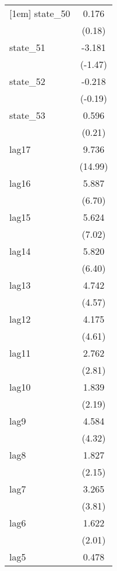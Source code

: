 {\begin{tabular}{l*{1}{c}}
[1em]
state\_50    &       0.176         \\
            &      (0.18)         \\
[1em]
state\_51    &      -3.181         \\
            &     (-1.47)         \\
[1em]
state\_52    &      -0.218         \\
            &     (-0.19)         \\
[1em]
state\_53    &       0.596         \\
            &      (0.21)         \\
[1em]
lag17       &       9.736\sym{***}\\
            &     (14.99)         \\
[1em]
lag16       &       5.887\sym{***}\\
            &      (6.70)         \\
[1em]
lag15       &       5.624\sym{***}\\
            &      (7.02)         \\
[1em]
lag14       &       5.820\sym{***}\\
            &      (6.40)         \\
[1em]
lag13       &       4.742\sym{***}\\
            &      (4.57)         \\
[1em]
lag12       &       4.175\sym{***}\\
            &      (4.61)         \\
[1em]
lag11       &       2.762\sym{**} \\
            &      (2.81)         \\
[1em]
lag10       &       1.839\sym{*}  \\
            &      (2.19)         \\
[1em]
lag9        &       4.584\sym{***}\\
            &      (4.32)         \\
[1em]
lag8        &       1.827\sym{*}  \\
            &      (2.15)         \\
[1em]
lag7        &       3.265\sym{***}\\
            &      (3.81)         \\
[1em]
lag6        &       1.622\sym{*}  \\
            &      (2.01)         \\
[1em]
lag5        &       0.478         \\

\end{tabular}}
